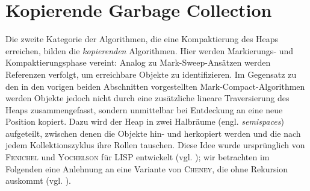 \section{Kopierende Garbage Collection}
\label{sec:copying}
Die zweite Kategorie der Algorithmen, die eine Kompaktierung des Heaps erreichen, bilden die \textit{kopierenden} Algorithmen.
Hier werden Markierungs- und Kompaktierungsphase vereint:
Analog zu Mark-Sweep-Ansätzen werden Referenzen verfolgt, um erreichbare Objekte zu identifizieren.
Im Gegensatz zu den in den vorigen beiden Abschnitten vorgestellten Mark-Compact-Algorithmen werden Objekte jedoch nicht durch eine zusätzliche lineare Traversierung des Heaps zusammengefasst, sondern unmittelbar bei Entdeckung an eine neue Position kopiert.
Dazu wird der Heap in zwei Halbräume (engl. \textit{semispaces}) aufgeteilt, zwischen denen die Objekte hin- und herkopiert werden und die nach jedem Kollektionszyklus ihre Rollen tauschen.
Diese Idee wurde ursprünglich von \textsc{Fenichel} und \textsc{Yochelson} für LISP entwickelt (vgl. \cite{fenichel1969}); wir betrachten im Folgenden eine Anlehnung an eine Variante von \textsc{Cheney}, die ohne Rekursion auskommt (vgl. \cite{cheney1970}).

